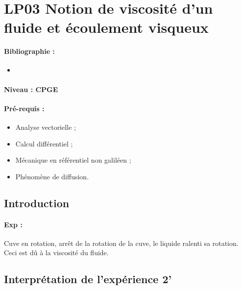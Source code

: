 \section{LP03 Notion de viscosité d'un fluide et écoulement visqueux}

\paragraph{Bibliographie :}
\begin{itemize}
\item 
\end{itemize}

\paragraph{Niveau : CPGE} 

\paragraph{Pré-requis :}
\begin{itemize}
\item Analyse vectorielle ;
\item Calcul différentiel ;
\item Mécanique en référentiel non galiléen ;
\item Phénomène de diffusion.
\end{itemize}

\subsection{Introduction}

\paragraph{Exp :} Cuve en rotation, arrêt de la rotation de la cuve, le liquide ralenti sa rotation.
Ceci est dû à la viscosité du fluide.

\subsection{Interprétation de l'expérience 2'}


